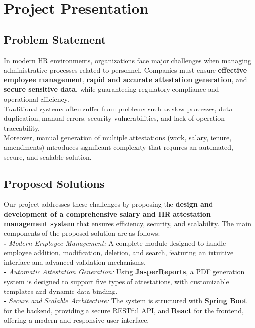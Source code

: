 \documentclass[a4paper,12pt]{report}
\begin{document}
\section{Project Presentation}
\begin{doublespace}

\subsection{Problem Statement}
\hspace{1cm}In modern HR environments, organizations face major challenges when managing administrative processes related to personnel. 
Companies must ensure \textbf{effective employee management}, \textbf{rapid and accurate attestation generation}, and \textbf{secure sensitive data}, while guaranteeing regulatory compliance and operational efficiency. \\
Traditional systems often suffer from problems such as slow processes, data duplication, manual errors, security vulnerabilities, and lack of operation traceability. \\
Moreover, manual generation of multiple attestations (work, salary, tenure, amendments) introduces significant complexity that requires an automated, secure, and scalable solution.

\subsection{Proposed Solutions}
\hspace{1cm}Our project addresses these challenges by proposing the \textbf{design and development of a comprehensive salary and HR attestation management system} that ensures efficiency, security, and scalability. 
The main components of the proposed solution are as follows: \\

\textbf{-} \textit{Modern Employee Management:} A complete module designed to handle employee addition, modification, deletion, and search, featuring an intuitive interface and advanced validation mechanisms. \\

\textbf{-} \textit{Automatic Attestation Generation:} Using \textbf{JasperReports}, a PDF generation system is designed to support five types of attestations, with customizable templates and dynamic data binding. \\

\textbf{-} \textit{Secure and Scalable Architecture:} The system is structured with \textbf{Spring Boot} for the backend, providing a secure RESTful API, and \textbf{React} for the frontend, offering a modern and responsive user interface. \\


\end{doublespace}
\end{document}
